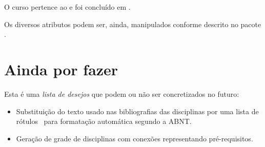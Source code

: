 \documentclass[a4paper, 11pt]{article}
\begin{document}
\begin{PDExample}
    O curso pertence ao  e foi concluído em .
\end{PDExample}

Os diversos atributos podem ser, ainda, manipulados conforme descrito no pacote .


\section{Ainda por fazer}
Esta é uma \textit{lista de desejos} que podem ou não ser concretizados no futuro:

\begin{itemize}
    \item Substituição do texto usado nas bibliografias das disciplinas por uma lista de rótulos \BibTeX\ para formatação automática segundo a ABNT.
    \item Geração de grade de disciplinas com conexões representando pré-requisitos.
\end{itemize}

\printindex
\end{document}
